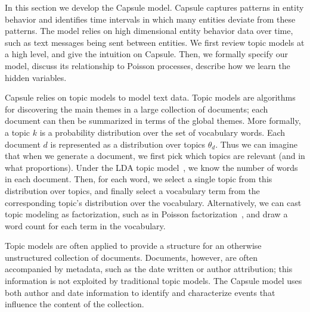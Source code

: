 
In this section we develop the Capsule model.  Capsule captures patterns in entity behavior and identifies time intervals in which many entities deviate from these patterns.  The model relies on high dimensional entity behavior data over time, such as text messages being sent between entities.  We first review topic models at a high level, and give the intuition on Capsule. Then, we formally specify our model, discuss its relationship to Poisson processes, describe how we learn the hidden variables.

 Capsule relies on topic models to model text data.  Topic models are algorithms for discovering the main themes in a large collection of documents; each document can then be summarized in terms of the global themes.  More formally, a topic $k$ is a probability distribution over the set of vocabulary words.  Each document $d$ is represented as a distribution over topics $\theta_d$.  Thus we can imagine that when we generate a document, we first pick which topics are relevant (and in what proportions).  Under the LDA topic model~\cite{Blei:2003}, we know the number of words in each document.  Then, for each word, we select a single topic from this distribution over topics, and finally select a vocabulary term from the corresponding topic's distribution over the vocabulary.  Alternatively, we can cast topic modeling as factorization, such as in Poisson factorization~\cite{Gopalan:2014b}, and draw a word count for each term in the vocabulary.

Topic models are often applied to provide a structure for an otherwise unstructured collection of documents.  Documents, however, are often accompanied by metadata, such as the date written or author attribution; this information is not exploited by traditional topic models.  The Capsule model uses both author and date information to identify and characterize events that influence the content of the collection.


